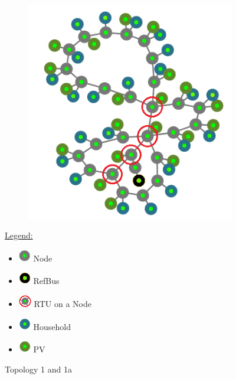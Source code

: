 \documentclass[conference]{IEEEtran}
\begin{document}
		\begin{figure}[!htp]
			\begin{subfigure}{0.5\textwidth}
				\includegraphics[width=\textwidth]{pics/topo_1_2.png}
			\end{subfigure}
			\underline{Legend:}%
			\begin{itemize}
				\item[] \includegraphics[height=15pt]{pics/Node.png} Node
				\item[] \includegraphics[height=15pt]{pics/RefBus.png} RefBus
				\item[] \includegraphics[height=15pt]{pics/RTU.png} RTU on a Node
				\item[] \includegraphics[height=15pt]{pics/Household.png} Household
				\item[] \includegraphics[height=15pt]{pics/PV.png} PV
			\end{itemize}
			\caption{Topology 1 and 1a}
			\label{img:topo_1_2}
		\end{figure}
		
\end{document}
